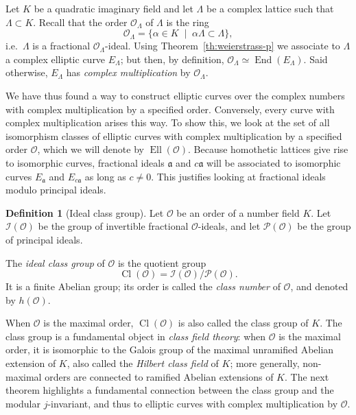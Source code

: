 \documentclass[10pt]{article}
\theoremstyle{plain}
\theoremstyle{definition}
\newtheorem{definition}[theorem]{Definition}
\DeclareMathOperator{\End}{End} %
\DeclareMathOperator{\Cl}{Cl}
\DeclareMathOperator{\Ell}{Ell}
\def\O{\ensuremath{\mathcal{O}}}
\def\a{\ensuremath{\mathfrak{a}}}
\begin{document}
Let $K$ be a quadratic imaginary field and let $Λ$ be a complex
lattice such that $Λ⊂K$. %
Recall that the order $\O_Λ$ of $Λ$ is the ring
\begin{equation}
  \label{eq:lattice-order}
  \O_Λ = \{ α ∈ K \;\mid\; αΛ ⊂ Λ \},
\end{equation}
i.e.\ $Λ$ is a fractional $\O_Λ$-ideal. %
Using Theorem~\ref{th:weierstrass-p} we associate to $Λ$ a complex
elliptic curve $E_Λ$; but then, by definition, $\O_Λ≃\End(E_Λ)$. %
Said otherwise, $E_Λ$ has \emph{complex multiplication} by $\O_Λ$.

We have thus found a way to construct elliptic curves over the complex
numbers with complex multiplication by a specified order. %
Conversely, every curve with complex multiplication arises this way. %
To show this, we look at the set of all isomorphism classes of
elliptic curves with complex multiplication by a specified order $\O$,
which we will denote by $\Ell(\O)$. %
Because homothetic lattices give rise to isomorphic curves, fractional
ideals $\a$ and $c\a$ will be associated to isomorphic curves $E_\a$
and $E_{c\a}$ as long as $c≠0$. %
This justifies looking at fractional ideals modulo principal ideals.

\begin{definition}[Ideal class group]
  Let $\O$ be an order of a number field $K$. %
  Let $\mathcal{I}(\O)$ be the group of invertible fractional
  $\O$-ideals, and let $\mathcal{P}(\O)$ be the group of principal
  ideals. %

  The \emph{ideal class group} of $\O$ is the quotient group
  \[\Cl(\O) = \mathcal{I}(\O)/\mathcal{P}(\O).\]
  It is a finite Abelian group; its order is called the \emph{class
    number} of $\O$, and denoted by $h(\O)$.
\end{definition}

When $\O$ is the maximal order, $\Cl(\O)$ is also called the class
group of $K$. %
The class group is a fundamental object in \emph{class field theory}:
when $\O$ is the maximal order, it is isomorphic to the Galois group
of the maximal unramified Abelian extension of $K$, also called the
\emph{Hilbert class field} of $K$; more generally, non-maximal orders
are connected to ramified Abelian extensions of $K$. %
The next theorem highlights a fundamental connection between the class
group and the modular $j$-invariant, and thus to elliptic curves with
complex multiplication by $\O$.
\end{document}
